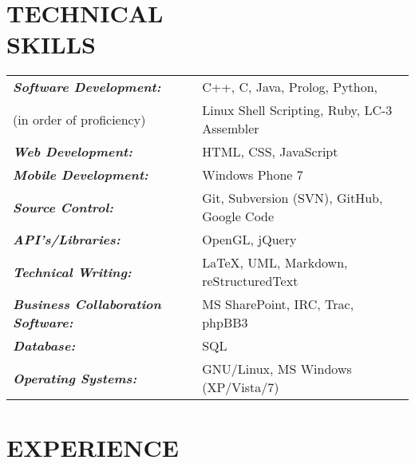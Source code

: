 \documentclass[margin]{res}
\begin{document}
\begin{resume}
\section{TECHNICAL \\ SKILLS}
	\begin{tabular}{l l}
	{\sl \textbf{Software Development:}} &
  C++, C, Java, Prolog, Python, \\ (in order of proficiency) &
  Linux Shell Scripting, Ruby, LC-3 Assembler \\

	{\sl \textbf{Web Development:}} &
	HTML, CSS, JavaScript \\

	{\sl \textbf{Mobile Development:}} &
	Windows Phone 7 \\

	{\sl \textbf{Source Control:}} &
	Git, Subversion (SVN), GitHub, Google Code \\

	{\sl \textbf{API's/Libraries:}} &
	OpenGL, jQuery \\

	{\sl \textbf{Technical Writing:}} &
	\LaTeX, UML, Markdown, reStructuredText \\

	{\sl \textbf{Business Collaboration Software:}} &
  MS SharePoint, IRC, Trac, phpBB3 \\
	  
	{\sl \textbf{Database:}} &	  
  SQL \\	  
	  
	{\sl \textbf{Operating Systems:}} &
  GNU/Linux, MS Windows (XP/Vista/7)

	\end{tabular}	 

\section{EXPERIENCE}


\end{resume}
\end{document}
